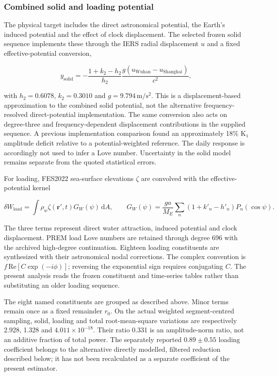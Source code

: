 \documentclass[
  10pt,
  a4paper,
]{article}
\begin{document}
\hypertarget{combined-solid-and-loading-potential}{%
\subsubsection{Combined solid and loading
potential}\label{combined-solid-and-loading-potential}}

The physical target includes the direct astronomical potential, the
Earth's induced potential and the effect of clock displacement. The
selected frozen solid sequence implements these through the IERS radial
displacement \(u\) and a fixed effective-potential conversion,

\[y_{\mathrm{solid}}=-\frac{1+k_2-h_2}{h_2}\frac{g(u_{\mathrm{Wuhan}}-u_{\mathrm{Shanghai}})}{c^2},\]

with \(h_2=0.6078\), \(k_2=0.3010\) and \(g=9.794\,\mathrm{m/s^2}\).
This is a displacement-based approximation to the combined solid
potential, not the alternative frequency-resolved direct-potential
implementation. The same conversion also acts on degree-three and
frequency-dependent displacement contributions in the supplied sequence.
A previous implementation comparison found an approximately 18\% K₁
amplitude deficit relative to a potential-weighted reference. The daily
response is accordingly not used to infer a Love number. Uncertainty in
the solid model remains separate from the quoted statistical errors.

For loading, FES2022 sea-surface elevations \(\zeta\) are convolved with
the effective-potential kernel

\[\delta W_{\mathrm{load}}=\int \rho_w\zeta(\mathbf{r}',t)G_W(\psi)\,\mathrm{d}A,\qquad
G_W(\psi)=\frac{ga}{M_E}\sum_n(1+k'_n-h'_n)P_n(\cos\psi).\]

The three terms represent direct water attraction, induced potential and
clock displacement. PREM load Love numbers are retained through degree
696 with the archived high-degree continuation. Eighteen loading
constituents are synthesized with their astronomical nodal corrections.
The complex convention is \(f\,\mathrm{Re}[C\exp(-i\phi)]\); reversing
the exponential sign requires conjugating \(C\). The present analysis
reads the frozen constituent and time-series tables rather than
substituting an older loading sequence.

The eight named constituents are grouped as described above. Minor terms
remain once as a fixed remainder \(r_0\). On the actual weighted
segment-centred sampling, solid, loading and total root-mean-square
variations are respectively 2.928, 1.328 and \(4.011\times10^{-18}\).
Their ratio 0.331 is an amplitude-norm ratio, not an additive fraction
of total power. The separately reported \(0.89\pm0.55\) loading
coefficient belongs to the alternative directly modelled, filtered
reduction described below; it has not been recalculated as a separate
coefficient of the present estimator.
\end{document}
